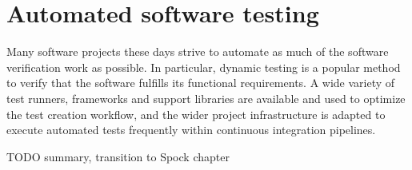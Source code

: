 \chapter{Automated software testing}\label{chap:Testing}
Many software projects these days
strive to automate as much of the
software verification work as possible.
In particular, dynamic testing
is a popular method to verify
that the software fulfills
its functional requirements.
A wide variety of test runners,
frameworks and support libraries are
available and used to optimize
the test creation workflow,
and the wider project infrastructure
is adapted to execute automated tests frequently
within continuous integration pipelines.











TODO summary, transition to Spock chapter
